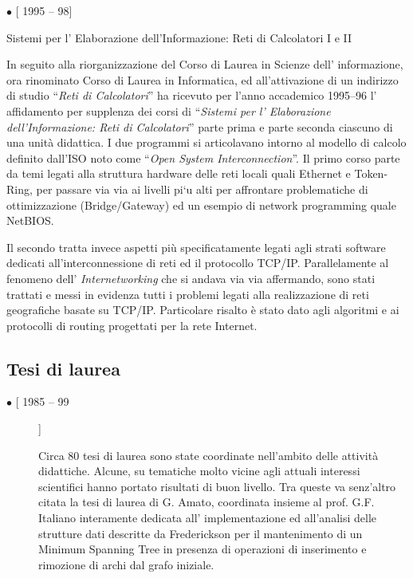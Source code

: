 \documentclass[11pt]{article}
\newlength{\posii}
\newlength{\posiibox}
\newlength{\boxsize}
\begin{document}
\begin{description}
\item \parbox[t]{\posiibox} 
{\bf \raggedright $ \bullet $ [ 1995 -- 98] \par
\medskip
Sistemi per l' Elaborazione dell'Informazione: Reti di Calcolatori I
e II}
\hfill \parbox[t]{\boxsize} {

In seguito alla riorganizzazione del Corso di Laurea in Scienze dell'
informazione, ora rinominato Corso di Laurea in Informatica, ed
all'attivazione di un indirizzo di studio ``{\sl Reti di
Calcolatori}'' ha ricevuto per l'anno accademico 1995--96 l'
affidamento per supplenza dei corsi di ``{\sl Sistemi per l'
Elaborazione dell'Informazione: Reti di Calcolatori}'' parte prima e
parte seconda ciascuno di una unit\`a didattica.  I due programmi si
articolavano intorno al modello di calcolo definito dall'ISO noto come
``{\sl Open System Interconnection}''.  Il primo corso parte da temi
legati alla struttura hardware delle reti locali quali Ethernet e
Token-Ring, per passare via via ai livelli pi\a`u alti per affrontare
problematiche di ottimizzazione (Bridge/Gateway) ed un esempio di
network programming quale NetBIOS.

Il secondo tratta invece aspetti pi\`u specificatamente legati agli
strati software dedicati all'interconnessione di reti ed il
protocollo TCP/IP. Parallelamente al fenomeno dell'{\sl
Internetworking} che si andava via via affermando, sono stati
trattati e messi in evidenza tutti i problemi legati alla
realizzazione di reti geografiche basate su TCP/IP.  Particolare
risalto \`e stato dato agli algoritmi e ai protocolli di routing
progettati per la rete Internet.}
\end{description}

\subsection{Tesi di laurea}
\begin{description}
\item [$ \bullet $ [ 1985 -- 99]] \hfill\parbox[t]{\boxsize} {Circa 80
    tesi di laurea sono state coordinate nell'ambito delle attivit\`a
    didattiche.  Alcune, su tematiche molto vicine agli attuali
    interessi scientifici hanno portato risultati di buon livello.
    Tra queste va senz'altro citata la tesi di laurea di G. Amato,
    coordinata insieme al prof. G.F. Italiano interamente dedicata all'
    implementazione ed all'analisi delle strutture dati descritte da
    Frederickson per il mantenimento di un Minimum Spanning Tree in
    presenza di operazioni di inserimento e rimozione di archi dal
    grafo iniziale.}
\end{description}
\end{document}

